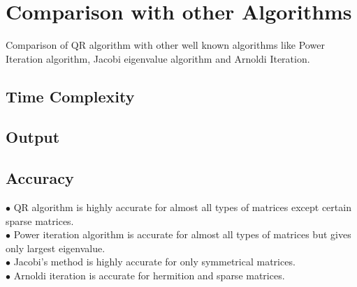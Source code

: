 \documentclass[12pt,a4paper]{article}
\begin{document}
\section{Comparison with other Algorithms}
Comparison of QR algorithm with other well known algorithms like Power Iteration algorithm, Jacobi eigenvalue algorithm and Arnoldi Iteration.
\subsection{Time Complexity}
\begin{table}[h!]
\centering

\end{table}

\subsection{Output}
\begin{table}[h!]
\centering

\end{table}

\subsection{Accuracy}
$\bullet$ QR algorithm is highly accurate for almost all types of matrices except certain sparse matrices.\\
$\bullet$ Power iteration algorithm is accurate for almost all types of matrices but gives only largest eigenvalue. \\
$\bullet$ Jacobi's method is highly accurate for only symmetrical matrices.\\
$\bullet$ Arnoldi iteration is accurate for hermition and sparse matrices. 
\end{document}
